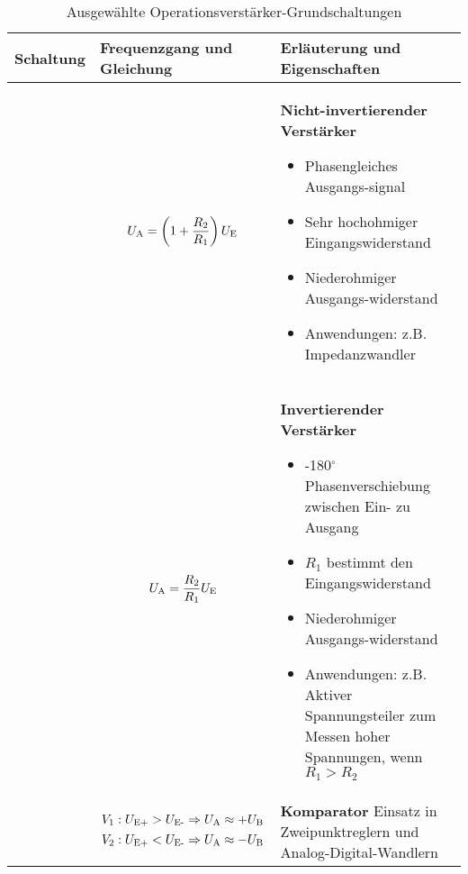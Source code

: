 \begin{table}[ht]
    \caption{Ausgewählte Operationsverstärker-Grundschaltungen}
    \label{tab:Grundschaltungen}
    \begin{tabular}{|m{}|m{}|m{}|}
    \hline
    Schaltung & Frequenzgang und Gleichung & Erläuterung und Eigenschaften\\ %
    \hline
    \vspace{0.5cm}
    \centering
     & 
\vspace{1ex}
\[
U_{\textnormal{A}} = \left(1+\frac{R_2}{R_1}\right) U_{\textnormal{E}}
\]
    &
    \textbf{Nicht-invertierender Verstärker}
\begin{itemize}
    \item Phasengleiches Ausgangs-\linebreak signal
    \item Sehr hochohmiger Eingangswiderstand
    \item Niederohmiger Ausgangs-\linebreak widerstand
    \item Anwendungen: z.B. Impedanzwandler
\end{itemize} \\
    \hline
    \centering
    
     & 
    \begin{center}
        
\end{center}
\vspace{1ex}
\[
    U_{\textnormal{A}} = \frac{R_2}{R_1} U_{\textnormal{E}}
\]
    &
    \textbf{Invertierender Verstärker}
\begin{itemize}
    \item -180$^\circ$ Phasenverschiebung zwischen Ein- zu Ausgang
    \item $R_1$ bestimmt den Eingangswiderstand
    \item Niederohmiger Ausgangs-\linebreak widerstand
    \item Anwendungen: \linebreak z.B. Aktiver Spannungsteiler zum Messen hoher Spannungen, wenn $R_1 > R_2$
\end{itemize}
\\ %
    \hline
    \centering
    
    & 
    \begin{center}
               
\[
V_1: U_{\textnormal{E+}} > U_{\textnormal{E-}} \Rightarrow U_{\textnormal{A}} \approx +U_{\textnormal{B}}
\]
\[
V_2: U_{\textnormal{E+}} < U_{\textnormal{E-}} \Rightarrow U_{\textnormal{A}} \approx -U_{\textnormal{B}}
\]
\end{center}
    &\textbf{Komparator}\newline
    Einsatz in Zweipunktreglern und Analog-Digital-Wandlern
\\ %
    \hline


\end{tabular}
\end{table}
